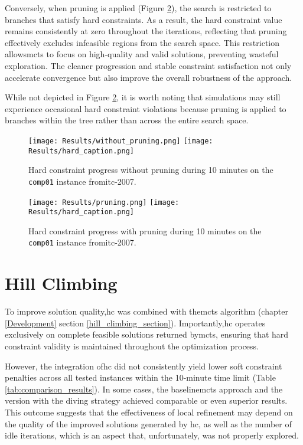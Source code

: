 Conversely, when pruning is applied (Figure \ref{fig:pruning_result}), the search is restricted to branches that satisfy hard constraints. As a result, the hard constraint value remains consistently at zero throughout the iterations, reflecting that pruning effectively excludes infeasible regions from the search space. This restriction allows\ac{mcts} to focus on high-quality and valid solutions, preventing wasteful exploration. The cleaner progression and stable constraint satisfaction not only accelerate convergence but also improve the overall robustness of the approach. 

While not depicted in Figure \ref{fig:pruning_result}, it is worth noting that simulations may still experience occasional hard constraint violations because pruning is applied to branches within the tree rather than across the entire search space.

\begin{figure}
 \centering
     \texttt{[image: Results/without\_pruning.png]}
     \texttt{[image: Results/hard\_caption.png]}
     \caption{Hard constraint progress without pruning during 10 minutes on the \texttt{comp01} instance from\ac{itc-2007}.}
     \label{fig:without_pruning_result}
\end{figure}

\begin{figure}
 \centering
    \texttt{[image: Results/pruning.png]}
    \texttt{[image: Results/hard\_caption.png]}
    \caption{Hard constraint progress with pruning during 10 minutes on the \texttt{comp01} instance from\ac{itc-2007}.}
    \label{fig:pruning_result}
\end{figure}

\section{Hill Climbing}

To improve solution quality,\ac{hc} was combined with the\ac{mcts} algorithm (chapter \ref{Development} section \ref{hill_climbing_section}). Importantly,\ac{hc} operates exclusively on complete feasible solutions returned by\ac{mcts}, ensuring that hard constraint validity is maintained throughout the optimization process.

However, the integration of\ac{hc} did not consistently yield lower soft constraint penalties across all tested instances within the 10-minute time limit (Table \ref{tab:comparison_results}). In some cases, the baseline\ac{mcts} approach and the version with the diving strategy achieved comparable or even superior results. This outcome suggests that the effectiveness of local refinement may depend on the quality of the improved solutions generated by \ac{hc}, as well as the number of idle iterations, which is an aspect that, unfortunately, was not properly explored.

